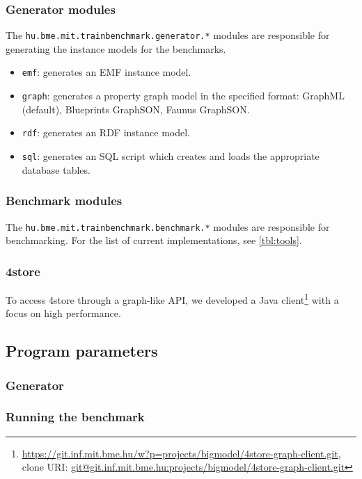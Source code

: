 \subsubsection{Generator modules}

The \texttt{hu.bme.mit.trainbenchmark.generator.*} modules are responsible for generating the instance models for the benchmarks.

\begin{itemize}
  \item \texttt{emf}: generates an EMF instance model.
  \item \texttt{graph}: generates a property graph model in the specified format: GraphML (default), Blueprints GraphSON, Faunus GraphSON.
  \item \texttt{rdf}: generates an RDF instance model.
  \item \texttt{sql}: generates an SQL script which creates and loads the appropriate database tables.
\end{itemize}



\subsubsection{Benchmark modules}

The \texttt{hu.bme.mit.trainbenchmark.benchmark.*} modules are responsible for benchmarking. For the list of current implementations, see \autoref{tbl:tools}.

\subsubsection{4store}

To access 4store through a graph-like API, we developed a Java client\footnote{\url{https://git.inf.mit.bme.hu/w?p=projects/bigmodel/4store-graph-client.git}, \\ clone URI: \url{git@git.inf.mit.bme.hu:projects/bigmodel/4store-graph-client.git}} with a focus on high performance.

\subsection{Program parameters}
\subsubsection{Generator}
\subsubsection{Running the benchmark}

